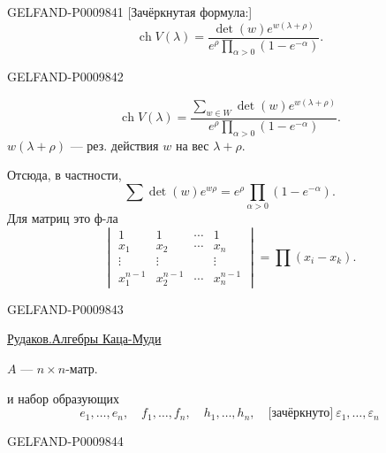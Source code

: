 \begin{GelfandAdjacentEvidence}{GELFAND-P000984}{1}
[Зачёркнутая формула:]
\[
\operatorname{ch}V(\lambda)=
\frac{\det(w)e^{w(\lambda+\rho)}}{e^\rho\prod_{\alpha>0}(1-e^{-\alpha})}.
\]
\end{GelfandAdjacentEvidence}
\begin{GelfandAdjacentEvidence}{GELFAND-P000984}{2}


\[
\operatorname{ch}V(\lambda)=
\frac{\displaystyle\sum_{w\in W}\det(w)e^{w(\lambda+\rho)}}
{e^\rho\displaystyle\prod_{\alpha>0}(1-e^{-\alpha})}.
\]
$w(\lambda+\rho)$ --- рез. действия $w$ на вес $\lambda+\rho$.

Отсюда, в частности,
\[
\sum\det(w)e^{w\rho}=e^\rho\prod_{\alpha>0}(1-e^{-\alpha}).
\]
Для матриц это ф-ла
\[
\begin{vmatrix}
1&1&\cdots&1\\
x_1&x_2&\cdots&x_n\\
\vdots&\vdots&&\vdots\\
x_1^{n-1}&x_2^{n-1}&\cdots&x_n^{n-1}
\end{vmatrix}
=\prod(x_i-x_k).
\]
\end{GelfandAdjacentEvidence}
\begin{GelfandAdjacentEvidence}{GELFAND-P000984}{3}


\underline{Рудаков.}\qquad \underline{Алгебры Каца-Муди}

$A$ --- $n\times n$-матр.

и набор образующих
\[
e_1,\ldots,e_n,\quad f_1,\ldots,f_n,\quad h_1,\ldots,h_n,\quad
\text{[зачёркнуто]}\ \varepsilon_1,\ldots,\varepsilon_n
\]
\end{GelfandAdjacentEvidence}
\begin{GelfandAdjacentEvidence}{GELFAND-P000984}{4}


\end{GelfandAdjacentEvidence}


